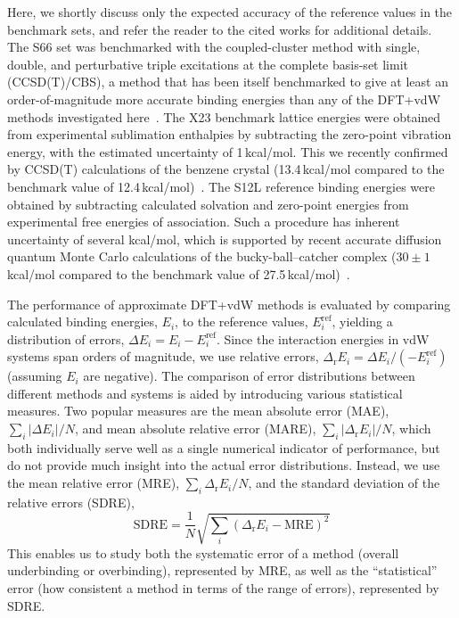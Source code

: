 Here, we shortly discuss only the expected accuracy of the reference values in the benchmark sets, and refer the reader to the cited works for additional details.
The S66 set was benchmarked with the coupled-cluster method with single, double, and perturbative triple excitations at the complete basis-set limit (CCSD(T)/CBS), a method that has been itself benchmarked to give at least an order-of-magnitude more accurate binding energies than any of the DFT+vdW methods investigated here~\cite{RezacJCTC13}. %
The X23 benchmark lattice energies were obtained from experimental sublimation enthalpies by subtracting the zero-point vibration energy, with the estimated uncertainty of 1\,kcal/mol.
This we recently confirmed by CCSD(T) calculations of the benzene crystal (13.4\,kcal/mol compared to the benchmark value of 12.4\,kcal/mol)~\cite{YangS14}. %
The S12L reference binding energies were obtained by subtracting calculated solvation and zero-point energies from experimental free energies of association.
Such a procedure has inherent uncertainty of several kcal/mol, which is supported by recent accurate diffusion quantum Monte Carlo calculations of the bucky-ball--catcher complex ($30\pm1$\,kcal/mol compared to the benchmark value of 27.5\,kcal/mol)~\cite{ZenPRB16}.

The performance of approximate DFT+vdW methods is evaluated by comparing calculated binding energies, $E_i$, to the reference values, $E_i^\text{ref}$, yielding a distribution of errors, $\Delta E_i=E_i-E_i^\text{ref}$.
Since the interaction energies in vdW systems span orders of magnitude, we use relative errors, $\Delta_\mathrm rE_i=\Delta E_i/(-E_i^\text{ref})$ (assuming $E_i$ are negative).
The comparison of error distributions between different methods and systems is aided by introducing various statistical measures.
Two popular measures are the mean absolute error (MAE), $\sum_i\lvert\Delta E_i\rvert/N$, and mean absolute relative error (MARE), $\sum_i\lvert\Delta_\mathrm rE_i\rvert/N$, which both individually serve well as a single numerical indicator of performance, but do not provide much insight into the actual error distributions.
Instead, we use the mean relative error (MRE), $\sum_i\Delta_\mathrm rE_i/N$, and the standard deviation of the relative errors (SDRE),
\[ \text{SDRE}=\frac1N\sqrt{\sum_i(\Delta_\mathrm rE_i-\text{MRE})^2} \]
This enables us to study both the systematic error of a method (overall underbinding or overbinding), represented by MRE, as well as the ``statistical'' error (how consistent a method in terms of the range of errors), represented by SDRE\@.

